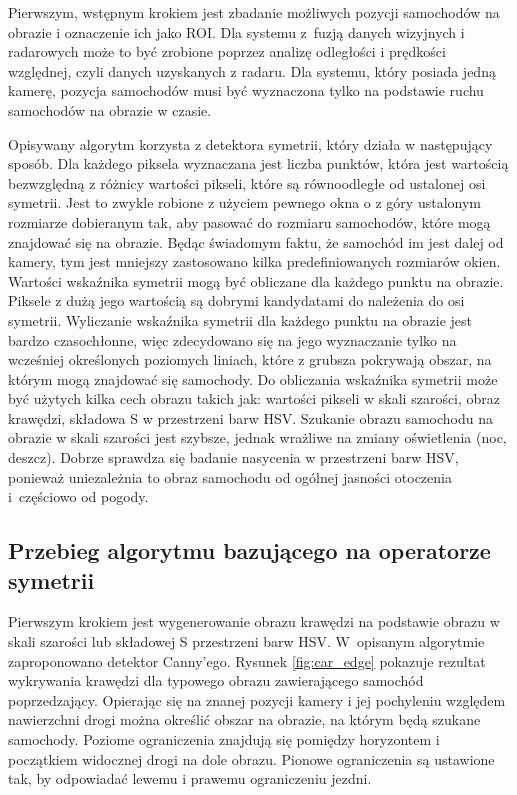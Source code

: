 Pierwszym, wstępnym krokiem jest zbadanie możliwych pozycji samochodów na obrazie i oznaczenie ich jako ROI.
Dla systemu z~fuzją danych wizyjnych i radarowych może to być zrobione poprzez analizę odległości i prędkości względnej, czyli danych uzyskanych z radaru. 
Dla systemu, który posiada jedną kamerę, pozycja samochodów musi być wyznaczona tylko na podstawie ruchu samochodów na obrazie w czasie.

Opisywany algorytm korzysta z detektora symetrii, który działa w następujący sposób. 
Dla każdego piksela wyznaczana jest liczba punktów, która jest wartością bezwzględną z różnicy wartości pikseli, które są równoodległe od ustalonej osi symetrii. %
Jest to zwykle robione z użyciem pewnego okna o z góry ustalonym rozmiarze dobieranym tak, aby pasować do rozmiaru samochodów, które mogą znajdować się na obrazie. 
Będąc świadomym faktu, że samochód im jest dalej od kamery, tym jest mniejszy zastosowano kilka predefiniowanych rozmiarów okien. 
Wartości wskaźnika symetrii mogą być obliczane dla każdego punktu na obrazie. 
Piksele z dużą jego wartością są dobrymi kandydatami do należenia do osi symetrii. %
Wyliczanie wskaźnika symetrii dla każdego punktu na obrazie jest bardzo czasochłonne, więc zdecydowano się na jego wyznaczanie tylko na wcześniej określonych poziomych liniach, które z grubsza pokrywają obszar, na którym mogą znajdować się samochody. %
Do obliczania wskaźnika symetrii może być użytych kilka cech obrazu takich jak: wartości pikseli w skali szarości, obraz krawędzi, składowa S w przestrzeni barw HSV. 
Szukanie obrazu samochodu na obrazie w skali szarości jest szybsze, jednak wrażliwe na zmiany oświetlenia (noc, deszcz). 
Dobrze sprawdza się badanie nasycenia w przestrzeni barw HSV, ponieważ uniezależnia to obraz samochodu od ogólnej jasności otoczenia i~częściowo od pogody.

\subsection{Przebieg algorytmu bazującego na operatorze symetrii}
Pierwszym krokiem jest wygenerowanie obrazu krawędzi na podstawie obrazu w skali szarości lub składowej S przestrzeni barw HSV. 
W~opisanym algorytmie zaproponowano detektor Canny'ego. 
Rysunek \ref{fig:car_edge} pokazuje rezultat wykrywania krawędzi dla typowego obrazu zawierającego samochód poprzedzający. 
Opierając się na znanej pozycji kamery i jej pochyleniu względem nawierzchni drogi można określić obszar na obrazie, na którym będą szukane samochody. 
Poziome ograniczenia znajdują się pomiędzy horyzontem i początkiem widocznej drogi na dole obrazu. 
Pionowe ograniczenia są ustawione tak, by odpowiadać lewemu i prawemu ograniczeniu jezdni. 

